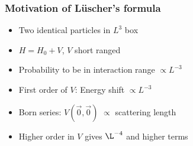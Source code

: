 \documentclass[english, fleqn]{beamer}
\begin{document}
\begin{frame}
    \frametitle{Motivation of Lüscher's formula}

    \begin{itemize}
        \item
            Two identical particles in $L^3$ box
        \item
            $H = H_0 + V$, $V$ short ranged
        \item
            Probability to be in interaction range $\propto L^{-3}$
        \item
            First order of $V$: Energy shift $\propto L^{-3}$
        \item
            Born series: $V(\vec 0, \vec 0)$ $\propto$ scattering length
        \item
            Higher order in $V$ gives $\L^{-4}$ and higher terms 
    \end{itemize}
\end{frame}
\end{document}
